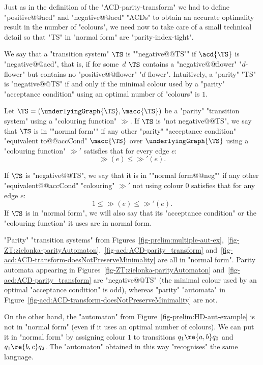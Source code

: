 \documentclass{theoretics}
\begin{document}
Just as in the definition of the "ACD-parity-transform" we had to define "positive@@acd" and "negative@@acd" "ACDs" to obtain an accurate optimality result in the number of "colours", we need now to take care of a small technical detail so that "TS" in "normal form" are "parity-index-tight".

\AP We say that a "transition system" $\TS$ is ""negative@@TS"" if $\acd{\TS}$ is "negative@@acd", that is, if for some~$d$ $\TS$ contains a "negative@@flower" "$d$-flower" but contains no "positive@@flower" "$d$-flower". Intuitively, a "parity" "TS" is "negative@@TS" if and only if the minimal colour used by a "parity" "acceptance condition" using an optimal number of "colours" is $1$.


\begin{definition}\label{def-normF:normal_form_parity}
	\AP Let $\TS = (\underlyingGraph{\TS}, \macc{\TS})$ be a "parity" "transition system" using a "colouring function" $\gg$. If $\TS$ is "not negative@@TS", we say that $\TS$ is in ""normal form"" if any other "parity" "acceptance condition" "equivalent to@@accCond" $\macc{\TS}$ over $\underlyingGraph{\TS}$ using a "colouring function" $\gg'$ satisfies that for every edge $e$:
	\[ \gg(e)\leq \gg'(e).  \]
	
	If $\TS$ is "negative@@TS", we say that it is in ""normal form@@neg"" if any other "equivalent@@accCond"  "colouring" $\gg'$ not using colour $0$ satisfies that for any edge $e$:
	\[  1\leq\gg(e)\leq \gg'(e).  \]
	If $\TS$ is in "normal form", we will also say that its "acceptance condition" or the "colouring function" it uses are in normal form.
\end{definition}


\begin{example}\label{ex-cor:normal-form}
	"Parity" "transition systems" from Figures~\ref{fig-prelim:multiple-aut-ex},~\ref{fig-ZT:zielonka-parityAutomaton},~\ref{fig-acd:ACD-parity_transform} and~\ref{fig-acd:ACD-transform-doesNotPreserveMinimality} are all in "normal form". Parity automata appearing in Figures~\ref{fig-ZT:zielonka-parityAutomaton} and~\ref{fig-acd:ACD-parity_transform} are "negative@@TS" (the minimal colour used by an optimal "acceptance condition" is odd), whereas "parity" "automata" in Figure~\ref{fig-acd:ACD-transform-doesNotPreserveMinimality} are not.
	
	On the other hand, the "automaton" from Figure~\ref{fig-prelim:HD-aut-example} is not in "normal form" (even if it uses an optimal number of colours). We can put it in "normal form" by assigning colour $1$ to transitions $q_1\re{a,b}q_0$ and $q_1\re{b,c}q_2$. The "automaton" obtained in this way "recognises" the same language.
\end{example}
\end{document}
